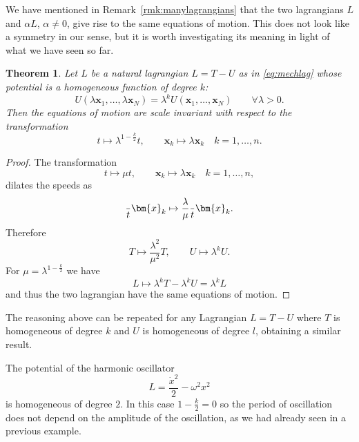 \documentclass[english,fontsize=11pt,paper=a5,oneside]{scrbook}
\newcommand{\bx}{\bm{x}}
\let\d\relax
\DeclareMathOperator{\d}{d}
\newtheorem{theorem}{Theorem}[chapter]
\theoremstyle{definition}
\newenvironment{remark}
  {\pushQED{\qed}\renewcommand{\qedsymbol}{$\lozenge$}\remarkx}
  {\popQED\endremarkx}
\newenvironment{example}
  {\pushQED{\qed}\renewcommand{\qedsymbol}{$\lozenge$}\examplex}
  {\popQED\endexamplex}
\begin{document}
We have mentioned in Remark~\ref{rmk:manylagrangians} that the two lagrangians $L$ and $\alpha L$, $\alpha\neq0$, give rise to the same equations of motion.
This does not look like a symmetry in our sense, but it is worth investigating its meaning in light of what we have seen so far.

\begin{theorem}
    Let $L$ be a natural lagrangian $L=T-U$ as in \eqref{eq:mechlag} whose potential is a homogeneous function of degree $k$:
    \begin{equation}
        U(\lambda\bx_1, \ldots, \lambda\bx_N) = \lambda^k U(\bx_1, \ldots, \bx_N)
        \qquad\forall \lambda>0.
    \end{equation}
    Then the equations of motion are scale invariant with respect to the transformation
    \begin{equation}
        t \mapsto \lambda^{1-\frac{k}2} t, \qquad
        \bx_k \mapsto \lambda\bx_k \quad k=1,\ldots,n.
    \end{equation}
\end{theorem}
\begin{proof}
    The transformation
    \begin{equation}
        t \mapsto \mu t, \qquad
        \bx_k \mapsto \lambda\bx_k \quad k=1,\ldots,n,
    \end{equation}
    dilates the speeds as
    \begin{equation}
        \frac{\d}{\d t} \bx_k \mapsto \frac{\lambda}{\mu} \frac{\d}{\d t}\bx_k.
    \end{equation}
    Therefore
    \begin{equation}
        T \mapsto \frac{\lambda^2}{\mu^2} T, \qquad U \mapsto \lambda^k U.
    \end{equation}
    For $\mu = \lambda^{1-\frac{k}2}$ we have
    \begin{equation}
        L \mapsto \lambda^k T - \lambda^k U = \lambda^k L
    \end{equation}
    and thus the two lagrangian have the same equations of motion.
\end{proof}

\begin{remark}
    The reasoning above can be repeated for any Lagrangian $L = T - U$ where $T$ is homogeneous of degree $k$ and $U$ is homogeneous of degree $l$, obtaining a similar result.
\end{remark}

\begin{example}[Harmonic oscillator]
    The potential of the harmonic oscillator
    \begin{equation}
        L = \frac{\dot x^2}2 - \omega^2 x^2
    \end{equation}
    is homogeneous of degree $2$. In this case $1-\frac k2 = 0$ so the period of oscillation does not depend on the amplitude of the oscillation, as we had already seen in a previous example.
\end{example}
\end{document}
